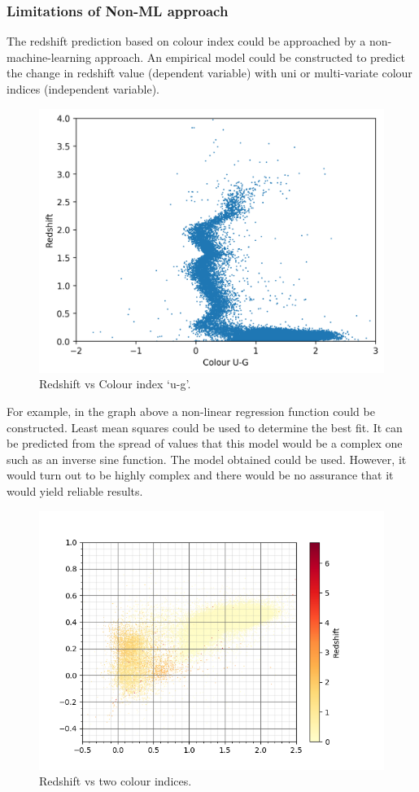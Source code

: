 \subsubsection{Limitations of Non-ML approach}
The redshift prediction based on colour index could be approached by a non-machine-learning approach. An empirical model could be constructed to predict the change in redshift value (dependent variable) with uni or multi-variate colour indices (independent variable).
\begin{figure}[H]
	\centering
	\includegraphics[width=\linewidth,keepaspectratio]{images/misc/redshift-U-G.png}
	\caption{Redshift vs Colour index `u-g'.}
	\label{fig:rvc}
\end{figure}
For example, in the graph above a non-linear regression function could be constructed. Least mean squares could be used to determine the best fit. It can be predicted from the spread of values that this model would be a complex one such as an inverse sine function. The model obtained could be used. However, it would turn out to be highly complex and there would be no assurance that it would yield reliable results. 
\begin{figure}[H]
	\centering
	\includegraphics[width=\linewidth,keepaspectratio]{images/misc/redshift-colour-colour.png}
	\caption{Redshift vs two colour indices.}
	\label{fig:rvi}
\end{figure}
